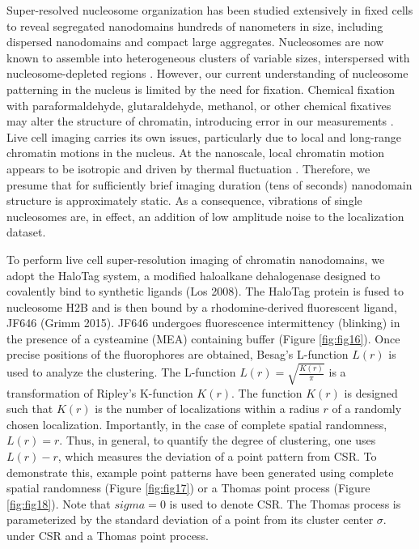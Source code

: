 Super-resolved nucleosome organization has been studied extensively in fixed cells to reveal segregated
nanodomains hundreds of nanometers in size, including dispersed nanodomains and compact large aggregates. Nucleosomes are now known to assemble into heterogeneous clusters of variable sizes, interspersed with nucleosome-depleted regions \parencite{Ricci2015}. However, our current understanding of nucleosome patterning in the nucleus is limited by the need for fixation. Chemical fixation with paraformaldehyde, glutaraldehyde, methanol, or other chemical fixatives may alter the structure of chromatin, introducing error in our measurements \parencite{Maeshima2020}. Live cell imaging carries its own issues, particularly due to local and long-range chromatin motions in the nucleus. At the nanoscale, local chromatin motion appears to be isotropic and driven by thermal fluctuation \parencite{Maeshima2020}. Therefore, we presume that for sufficiently brief imaging duration (tens of seconds) nanodomain structure is approximately static. As a consequence, vibrations of single nucleosomes are, in effect, an addition of low amplitude noise to the localization dataset. 

To perform live cell super-resolution imaging of chromatin nanodomains, we adopt the HaloTag system, a modified haloalkane dehalogenase designed to covalently bind to synthetic ligands (Los 2008). The HaloTag protein is fused to nucleosome H2B and is then bound by a rhodomine-derived fluorescent ligand, JF646 (Grimm 2015). JF646 undergoes fluorescence intermittency (blinking) in the presence of a cysteamine (MEA) containing buffer (Figure \ref{fig:fig16}). Once precise positions of the fluorophores are obtained, Besag’s L-function $L(r)$ is used to analyze the clustering. The L-function $L(r)= \sqrt{\frac{K(r)}{\pi}}$ is a transformation of Ripley’s K-function $K(r)$. The function $K(r)$ is designed such that $K(r)$ is the number of localizations within a radius $r$ of a randomly chosen localization. Importantly, in the case of complete spatial randomness, $L(r)=r$. Thus, in general, to quantify the degree of clustering, one uses $L(r)-r$, which measures the deviation of a point pattern from CSR. To demonstrate this, example point patterns have been generated using complete spatial randomness (Figure \ref{fig:fig17}) or a Thomas point process (Figure \ref{fig:fig18}). Note that $sigma=0$ is used to denote CSR. The Thomas process is parameterized by the standard deviation of a point from its cluster center $\sigma$. under CSR  and a Thomas point process. 


